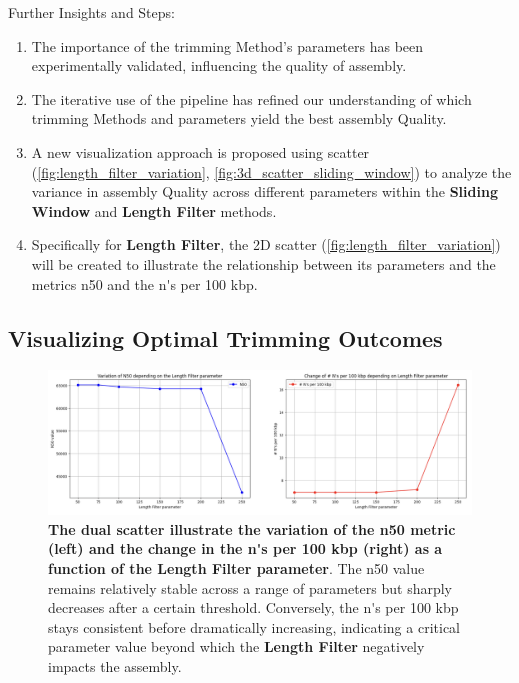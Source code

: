 Further Insights and Steps:

\begin{enumerate}
  \item The importance of the \gls{trimming} Method's parameters has been experimentally validated, influencing the quality of \gls{assembly}.
  \item The iterative use of the pipeline has refined our understanding of which \gls{trimming} Methods and parameters yield the best \gls{assembly} Quality.
  \item A new visualization approach is proposed using \gls{scatter} (\autoref{fig:length_filter_variation}, \autoref{fig:3d_scatter_sliding_window}) to analyze the variance in \gls{assembly} Quality across different parameters within the \textbf{Sliding Window} and \textbf{Length Filter} methods.
  \item Specifically for \textbf{Length Filter}, the 2D \gls{scatter} (\autoref{fig:length_filter_variation}) will be created to illustrate the relationship between its parameters and the metrics \gls{n50} and the \gls{n's per 100 kbp}.
\end{enumerate}



\subsection{Visualizing Optimal Trimming Outcomes}



\begin{figure}[H]
\centering
\includegraphics[width=\linewidth]{resources/images/length_filter_variation.png}
\caption{\textbf{The dual \gls{scatter} illustrate the variation of the \gls{n50} metric (left) and the change in the \gls{n's per 100 kbp} (right) as a function of the Length Filter parameter}. The \gls{n50} value remains relatively stable across a range of parameters but sharply decreases after a certain threshold. Conversely, the \gls{n's per 100 kbp} stays consistent before dramatically increasing, indicating a critical parameter value beyond which the \textbf{Length Filter} negatively impacts the \gls{assembly}.}
\label{fig:length_filter_variation}
\end{figure}

